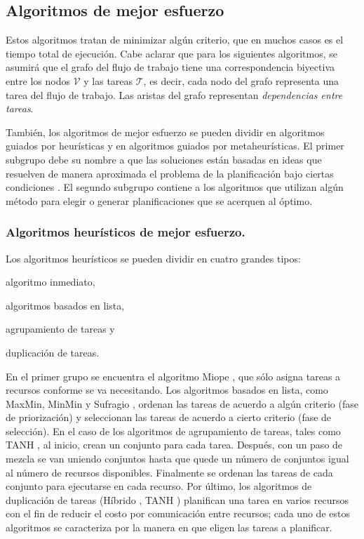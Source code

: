 

\subsection{Algoritmos de mejor esfuerzo}
Estos algoritmos tratan de minimizar algún criterio, que en muchos casos es el tiempo total de ejecución. Cabe aclarar que para los siguientes algoritmos, se asumirá que el grafo del flujo de trabajo tiene una correspondencia biyectiva entre los nodos $\mathcal{V}$ y las tareas $\mathcal{T}$, es decir, cada nodo del grafo representa una tarea del flujo de trabajo. Las aristas del grafo representan \emph{dependencias entre tareas}.

También, los algoritmos de mejor esfuerzo se pueden dividir en algoritmos guiados por heurísticas y en algoritmos guiados por metaheurísticas. El primer subgrupo debe su nombre a que las soluciones están basadas en ideas que resuelven de manera aproximada el problema de la planificación bajo ciertas condiciones \cite{yu2008workflow}. El segundo subgrupo contiene a los algoritmos que utilizan algún método para elegir o generar planificaciones que se acerquen al óptimo.

\subsubsection{Algoritmos heurísticos de mejor esfuerzo.}

Los algoritmos heurísticos se pueden dividir en cuatro grandes tipos: 
\begin{enumerate*}[label=\alph*)]
\item{algoritmo inmediato,}
\item{algoritmos basados en lista,}
\item{agrupamiento de tareas y}
\item{duplicación de tareas.}
\end{enumerate*}

En el primer grupo se encuentra el algoritmo Miope \cite{ramamritham1990efficient}, que sólo asigna tareas a recursos conforme se va necesitando. Los algoritmos basados en lista, como MaxMin, MinMin y Sufragio \cite{maheswaran1999dynamic}, ordenan las tareas de acuerdo a algún criterio (fase de priorización) y seleccionan las tareas de acuerdo a cierto criterio (fase de selección). En el caso de los algoritmos de agrupamiento de tareas, tales como TANH \cite{bajaj2004improving}, al inicio, crean un conjunto para cada tarea. Después, con un paso de mezcla se van uniendo conjuntos hasta que quede un número de conjuntos igual al número de recursos disponibles. Finalmente se ordenan las tareas de cada conjunto para ejecutarse en cada recurso. Por último, los algoritmos de duplicación de tareas (Híbrido \cite{sakellariou2004hybrid}, TANH \cite{bajaj2004improving}) planifican una tarea en varios recursos con el fin de reducir el costo por comunicación entre recursos; cada uno de estos algoritmos se caracteriza por la manera en que eligen las tareas a planificar.


